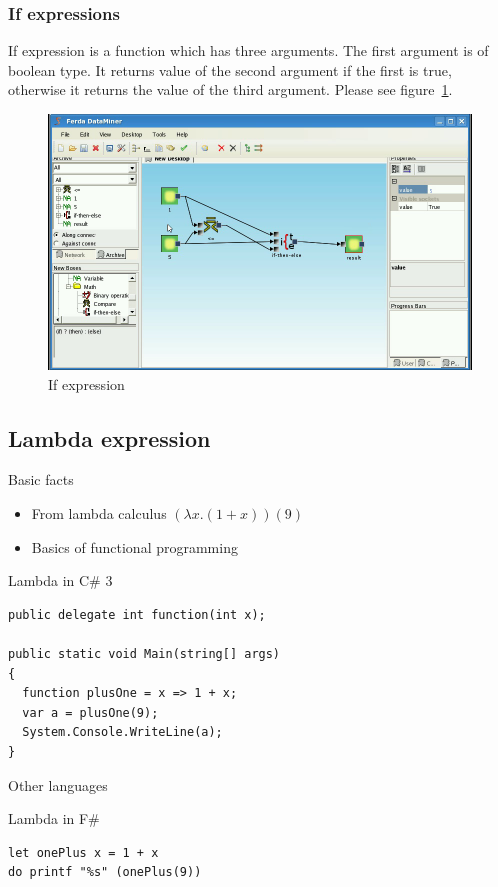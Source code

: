 \documentclass[a4paper,12pt]{book}
\begin{document}
\subsubsection{If expressions}
If expression is a function which has three arguments. The first argument is of boolean type. It returns value of the second argument if the first is true, otherwise it returns the value of the third argument. Please see figure~\ref{fig:boxIfThenElse}.
\begin{figure}
\includegraphics[width=13.72cm]{ifthenelse2.png}
	\caption{If expression}
	\label{fig:boxIfThenElse}
\end{figure}

\subsection{Lambda expression}
Basic facts
\begin{itemize}
	\item From lambda calculus $(\lambda x.(1+x))(9)$
	\item Basics of functional programming
\end{itemize}

Lambda in C\# 3
\begin{verbatim}
public delegate int function(int x);

public static void Main(string[] args)
{
  function plusOne = x => 1 + x;
  var a = plusOne(9);
  System.Console.WriteLine(a);
}
\end{verbatim}
	
Other languages

Lambda in F\#
\begin{verbatim}
let onePlus x = 1 + x
do printf "%s" (onePlus(9)) 
\end{verbatim}
\end{document}

